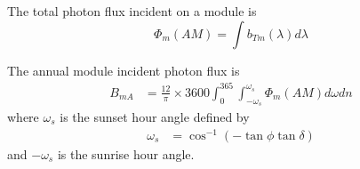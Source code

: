 \documentclass[preprint,12pt]{elsarticle}
\newcommand{\blue}[1]{{\leavevmode\color{blue}{#1}}} %
\begin{document}
%

The total photon flux incident on a module is 
\begin{equation}
\Phi_{m} (AM) = \int b_{Tm}  (\lambda) d \lambda %
\end{equation}


The annual module incident photon flux is
\begin{align}
B_{mA} &= \frac{12}{\pi} \times 3600 \int_{0}^{365} \int_{-\omega_s} ^{\omega_s} \Phi_{m} (AM) d \omega d n %
\end{align}
where $\omega_s$ is the sunset hour angle defined by 
\begin{align}
 \omega_s &= \cos^{-1} \left ( - \tan \phi \tan \delta \right ) 
\end{align}
and $-\omega_s$ is the sunrise hour angle.
\end{document}
